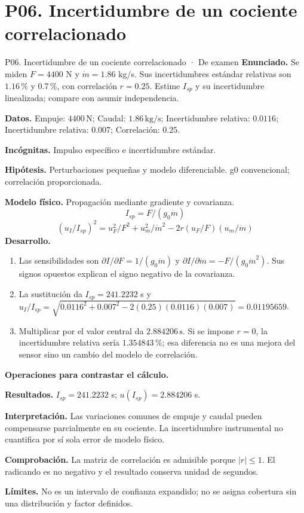 \section{P06. Incertidumbre de un cociente correlacionado}
\begin{studiumworked}{P06. Incertidumbre de un cociente correlacionado · De examen}
\textbf{Enunciado.} Se miden $F=4400$ N y $\dot m=1.86$ kg/s. Sus incertidumbres estándar relativas son $1.16$\,\% y 0.7\,\%, con correlación $r=0.25$. Estime $I_{sp}$ y su incertidumbre linealizada; compare con asumir independencia.

\textbf{Datos.} Empuje: $4400\,\mathrm{N}$; Caudal: $1.86\,\mathrm{kg/s}$; Incertidumbre relativa: $0.0116$; Incertidumbre relativa: $0.007$; Correlación: $0.25$.

\textbf{Incógnitas.} Impulso específico e incertidumbre estándar.

\textbf{Hipótesis.} Perturbaciones pequeñas y modelo diferenciable. g0 convencional; correlación proporcionada.

\textbf{Modelo físico.} Propagación mediante gradiente y covarianza.
\[I_{sp}=F/(g_0\dot m)\]
\[(u_I/I_{sp})^2=u_F^2/F^2+u_m^2/\dot m^2-2r(u_F/F)(u_m/\dot m)\]
\textbf{Desarrollo.}
\begin{enumerate}
\item Las sensibilidades son $\partial I/\partial F=1/(g_0\dot m)$ y $\partial I/\partial\dot m=-F/(g_0\dot m^2)$. Sus signos opuestos explican el signo negativo de la covarianza.
\item La sustitución da $I_{sp}=241.2232$ s y $u_I/I_{sp}=\sqrt{0.0116^2+0.007^2-2(0.25)(0.0116)(0.007)}=0.01195659$.
\item Multiplicar por el valor central da $2.884206\,\mathrm{s}$. Si se impone $r=0$, la incertidumbre relativa sería $1.354843$\,\%; esa diferencia no es una mejora del sensor sino un cambio del modelo de correlación.
\end{enumerate}
\textbf{Operaciones para contrastar el cálculo.}

\textbf{Resultados.} $I_{sp}=241.2232$ s; $u(I_{sp})=2.884206$ s.

\textbf{Interpretación.} Las variaciones comunes de empuje y caudal pueden compensarse parcialmente en su cociente. La incertidumbre instrumental no cuantifica por sí sola error de modelo físico.

\textbf{Comprobación.} La matriz de correlación es admisible porque $|r|\leq1$. El radicando es no negativo y el resultado conserva unidad de segundos.

\textbf{Límites.} No es un intervalo de confianza expandido; no se asigna cobertura sin una distribución y factor definidos.
\end{studiumworked}
